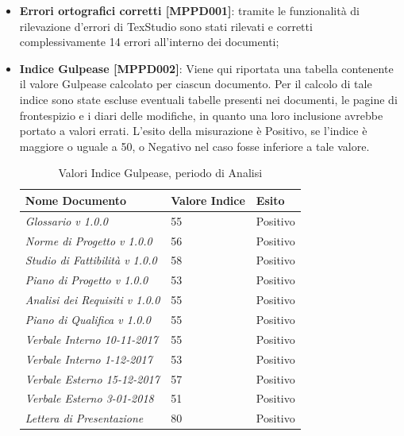 \documentclass[openany,12pt,a4paper]{report}
\begin{document}
\begin{itemize}
	\item \textbf{Errori ortografici corretti [MPPD001]}: tramite le funzionalità di rilevazione d'errori di TexStudio sono stati rilevati e corretti complessivamente 14 errori all'interno dei documenti;
	
	\item \textbf{Indice Gulpease [MPPD002]}: Viene qui riportata una tabella contenente il valore Gulpease calcolato per ciascun documento.
	Per il calcolo di tale indice sono state escluse eventuali tabelle presenti nei documenti, le pagine di frontespizio e i diari delle modifiche, in quanto una loro inclusione avrebbe portato a valori errati. L'esito della misurazione è Positivo, se l'indice è maggiore o uguale a 50, o Negativo nel caso fosse inferiore a tale valore.
	
	\begin{table}[h]
		\begin{center}
			\setlength\LTleft{6mm}
			\begin{longtable}{|p{60mm}|p{30mm}|p{25mm}|}
				\hline  
				\textbf{Nome Documento} & \textbf{Valore Indice} & \textbf{Esito} \\ \hline    
				\textit{Glossario v 1.0.0} & 55 & Positivo\\ \hline    
				\textit{Norme di Progetto v 1.0.0} & 56 & Positivo\\ \hline    
				\textit{Studio di Fattibilità v 1.0.0} & 58 & Positivo\\ \hline    
				\textit{Piano di Progetto v 1.0.0} & 53 & Positivo\\ \hline    
				\textit{Analisi dei Requisiti v 1.0.0} & 55 & Positivo\\ \hline    
				\textit{Piano di Qualifica v 1.0.0} & 55 & Positivo\\ \hline    
				\textit{Verbale Interno 10-11-2017} & 55 & Positivo\\ \hline    
				\textit{Verbale Interno 1-12-2017} & 53 & Positivo\\ \hline    
				\textit{Verbale Esterno 15-12-2017} & 57 & Positivo\\ \hline    
				\textit{Verbale Esterno 3-01-2018} & 51 & Positivo\\ \hline   
				\textit{Lettera di Presentazione} & 80 & Positivo\\ \hline
			\end{longtable}
		\end{center}
		\caption{Valori Indice Gulpease, periodo di Analisi} 
	\end{table} 
	

\end{itemize}
\end{document}
